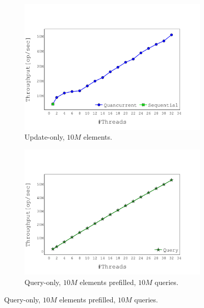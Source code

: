 \begin{figure}[h] %
\centering
    \begin{subfigure}[]{0.49\textwidth}
        \centering
        \includegraphics[width=\textwidth,trim={0cm 0cm 1.9cm 2.6cm},clip] {graphics/graphs/throughput/oracle_Quancurrent_blocking_numa_update_k4096_b16_keys10M_Tup32_runs15_16-08-2022_05-29-07.pdf}
        \caption{Update-only, $10M$ elements.}
        \label{fig:update_only_speedup}
    \end{subfigure}
    \begin{subfigure}[]{0.49\textwidth}
        \centering
        \includegraphics[width=\textwidth,trim={0cm 0cm 1.9cm 2.6cm},clip] {graphics/graphs/throughput/oracle_Quancurrent_blocking_numa_query_k4096_b16_keys10M_Tup32_runs15_prefill10M_prefillT1_16-08-2022_05-38-28.pdf}
        \caption{Query-only, $10M$ elements prefilled, $10M$ queries.}
        \label{fig:query_only_throughput}
    \end{subfigure}


\end{figure}
